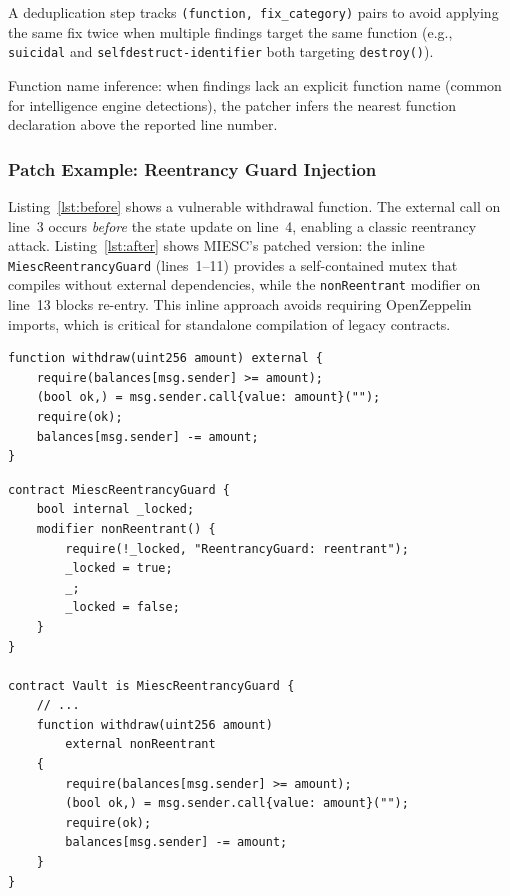 \documentclass[conference]{IEEEtran}
\begin{document}
A deduplication step tracks \texttt{(function, fix\_category)} pairs to avoid applying the same fix twice when multiple findings target the same function (e.g., \texttt{suicidal} and \texttt{selfdestruct-identifier} both targeting \texttt{destroy()}).

Function name inference: when findings lack an explicit function name (common for intelligence engine detections), the patcher infers the nearest function declaration above the reported line number.

\subsubsection{Patch Example: Reentrancy Guard Injection}

Listing~\ref{lst:before} shows a vulnerable withdrawal function. The external call on line~3 occurs \emph{before} the state update on line~4, enabling a classic reentrancy attack. Listing~\ref{lst:after} shows MIESC's patched version: the inline \texttt{MiescReentrancyGuard} (lines~1--11) provides a self-contained mutex that compiles without external dependencies, while the \texttt{nonReentrant} modifier on line~13 blocks re-entry. This inline approach avoids requiring OpenZeppelin imports, which is critical for standalone compilation of legacy contracts.

\begin{lstlisting}[caption={Vulnerable: external call before state update},label={lst:before},float=htbp]
function withdraw(uint256 amount) external {
    require(balances[msg.sender] >= amount);
    (bool ok,) = msg.sender.call{value: amount}("");
    require(ok);
    balances[msg.sender] -= amount;
}
\end{lstlisting}

\begin{lstlisting}[caption={Patched: inline reentrancy guard injected by MIESC},label={lst:after},float=htbp]
contract MiescReentrancyGuard {
    bool internal _locked;
    modifier nonReentrant() {
        require(!_locked, "ReentrancyGuard: reentrant");
        _locked = true;
        _;
        _locked = false;
    }
}

contract Vault is MiescReentrancyGuard {
    // ...
    function withdraw(uint256 amount)
        external nonReentrant
    {
        require(balances[msg.sender] >= amount);
        (bool ok,) = msg.sender.call{value: amount}("");
        require(ok);
        balances[msg.sender] -= amount;
    }
}
\end{lstlisting}
\end{document}
